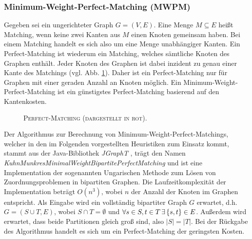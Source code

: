 \subsubsection{Minimum-Weight-Perfect-Matching (\textsc{MWPM})}
\label{sec:digression_mwpm}

Gegeben sei ein ungerichteter Graph $G = (V, E)$. Eine Menge $M \subseteq E$ heißt Matching,
wenn keine zwei Kanten aus $M$ einen Knoten gemeinsam haben. Bei einem Matching handelt es sich also
um eine Menge unabhängiger Kanten. Ein Perfect-Matching ist wiederum ein Matching, welches sämtliche Knoten des Graphen enthält.
Jeder Knoten des Graphen ist dabei inzident zu genau einer Kante des Matchings (vgl. Abb. \ref{fig:perfect_matching}).
Daher ist ein Perfect-Matching nur für Graphen mit einer geraden Anzahl an Knoten möglich.
Ein Minimum-Weight-Perfect-Matching ist ein günstigstes Perfect-Matching basierend auf den Kantenkosten.
\begin{figure}[H]
\centering
{}
\caption{\textsc{Perfect-Matching (dargestellt in rot).}}
\label{fig:perfect_matching}
\end{figure}

Der Algorithmus zur Berechnung von Minimum-Weight-Perfect-Matchings, welcher in den im Folgenden
vorgestellten Heuristiken zum Einsatz kommt, stammt aus der Java-Bibliothek \textit{JGraphT} \cite{JGraphT}, trägt
den Namen \textit{KuhnMunkresMinimalWeightBipartitePerfectMatching} und ist eine Implementation der
sogenannten Ungarischen Methode zum Lösen von Zuordnungsproblemen in bipartiten Graphen.
Die Laufzeitkomplexität der Implementation beträgt $O(n^3)$, wobei $n$ der Anzahl der Knoten im Graphen entspricht.
Als Eingabe wird ein vollständig bipartiter Graph $G$ erwartet, d.h. $G= (S \cup T, E)$, wobei $S \cap T = \emptyset$ und
$\forall s \in S, t \in T \thinspace \exists \thinspace \{s, t\} \in E$. Außerdem wird erwartet, dass beide Partitionen gleich groß sind,
also $|S| = |T|$. Bei der Rückgabe des Algorithmus handelt es sich um ein Perfect-Matching der geringsten Kosten.

